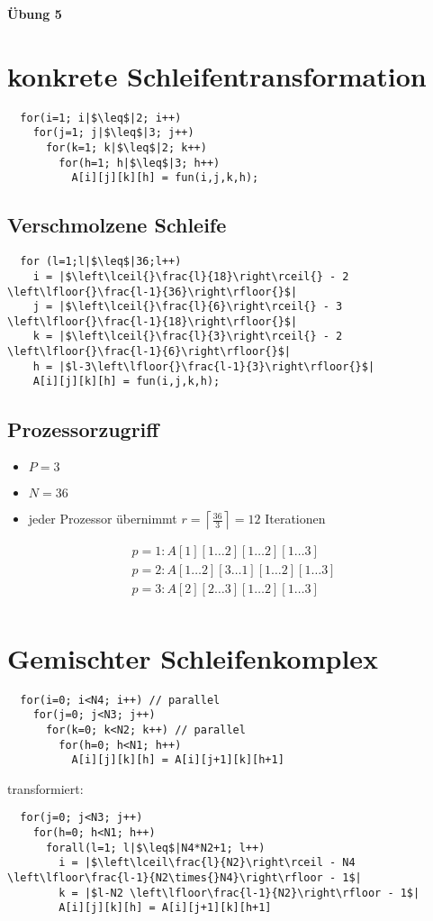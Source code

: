 \documentclass{article}
\begin{document}
{\LARGE\textbf{Übung 5}}

\section{konkrete Schleifentransformation}
\begin{verbatim}
  for(i=1; i|$\leq$|2; i++)
    for(j=1; j|$\leq$|3; j++)
      for(k=1; k|$\leq$|2; k++)
        for(h=1; h|$\leq$|3; h++)
          A[i][j][k][h] = fun(i,j,k,h);
\end{verbatim}

\subsection{Verschmolzene Schleife}
\begin{verbatim}
  for (l=1;l|$\leq$|36;l++)
    i = |$\left\lceil{}\frac{l}{18}\right\rceil{} - 2 \left\lfloor{}\frac{l-1}{36}\right\rfloor{}$|
    j = |$\left\lceil{}\frac{l}{6}\right\rceil{} - 3 \left\lfloor{}\frac{l-1}{18}\right\rfloor{}$|
    k = |$\left\lceil{}\frac{l}{3}\right\rceil{} - 2 \left\lfloor{}\frac{l-1}{6}\right\rfloor{}$|
    h = |$l-3\left\lfloor{}\frac{l-1}{3}\right\rfloor{}$|
    A[i][j][k][h] = fun(i,j,k,h);
\end{verbatim}

\subsection{Prozessorzugriff}
\begin{itemize}
  \item $P=3$
  \item $N=36$
  \item jeder Prozessor übernimmt $r=\left\lceil{}\frac{36}{3}\right\rceil{} = 12$ Iterationen
\end{itemize}
\begin{align}
  p=1: A[1][1\dots2][1\dots2][1\dots3] \\
  p=2: A[1\dots2][3\dots1][1\dots2][1\dots3] \\
  p=3: A[2][2\dots3][1\dots2][1\dots3] \\
\end{align}

\newpage
\section{Gemischter Schleifenkomplex}
\begin{verbatim}
  for(i=0; i<N4; i++) // parallel
    for(j=0; j<N3; j++)
      for(k=0; k<N2; k++) // parallel
        for(h=0; h<N1; h++)
          A[i][j][k][h] = A[i][j+1][k][h+1]
\end{verbatim}
transformiert:
\begin{verbatim}
  for(j=0; j<N3; j++)
    for(h=0; h<N1; h++)
      forall(l=1; l|$\leq$|N4*N2+1; l++)
        i = |$\left\lceil\frac{l}{N2}\right\rceil - N4 \left\lfloor\frac{l-1}{N2\times{}N4}\right\rfloor - 1$|
        k = |$l-N2 \left\lfloor\frac{l-1}{N2}\right\rfloor - 1$|
        A[i][j][k][h] = A[i][j+1][k][h+1]
\end{verbatim}
\end{document}
